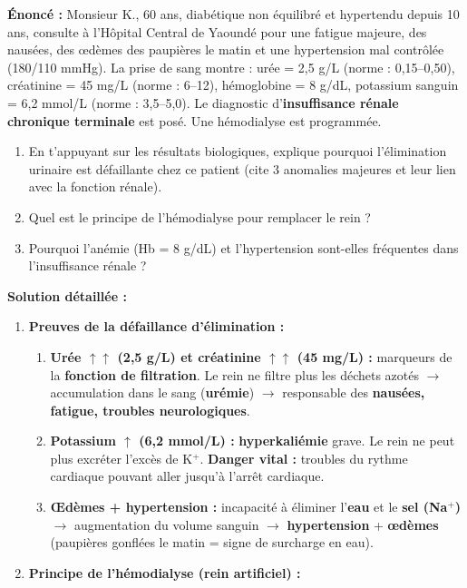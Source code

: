 \documentclass[11pt]{article}
\begin{document}
\begin{exoresolu}
    \textbf{Énoncé :} Monsieur K., 60 ans, diabétique non équilibré et hypertendu depuis 10 ans, consulte à l'Hôpital Central de Yaoundé pour une fatigue majeure, des nausées, des œdèmes des paupières le matin et une hypertension mal contrôlée (180/110 mmHg). La prise de sang montre : urée = 2,5 g/L (norme : 0,15--0,50), créatinine = 45 mg/L (norme : 6--12), hémoglobine = 8 g/dL, potassium sanguin = 6,2 mmol/L (norme : 3,5--5,0). Le diagnostic d'\textbf{insuffisance rénale chronique terminale} est posé. Une hémodialyse est programmée.
    \begin{enumerate}
        \item En t'appuyant sur les résultats biologiques, explique pourquoi l'élimination urinaire est défaillante chez ce patient (cite 3 anomalies majeures et leur lien avec la fonction rénale).
        \item Quel est le principe de l'hémodialyse pour remplacer le rein ?
        \item Pourquoi l'anémie (Hb = 8 g/dL) et l'hypertension sont-elles fréquentes dans l'insuffisance rénale ?
    \end{enumerate}
    \tcblower
    \textbf{Solution détaillée :}
    \begin{enumerate}
        \item \textbf{Preuves de la défaillance d'élimination :}
            \begin{enumerate}
                \item \textbf{Urée $\uparrow\uparrow$ (2,5 g/L) et créatinine $\uparrow\uparrow$ (45 mg/L) :} marqueurs de la \textbf{fonction de filtration}. Le rein ne filtre plus les déchets azotés $\rightarrow$ accumulation dans le sang (\textbf{urémie}) $\rightarrow$ responsable des \textbf{nausées, fatigue, troubles neurologiques}.
                \item \textbf{Potassium $\uparrow$ (6,2 mmol/L) :} \textbf{hyperkaliémie} grave. Le rein ne peut plus excréter l'excès de K$^+$. \textbf{Danger vital :} troubles du rythme cardiaque pouvant aller jusqu'à l'arrêt cardiaque.
                \item \textbf{Œdèmes + hypertension :} incapacité à éliminer l'\textbf{eau} et le \textbf{sel (Na$^+$)} $\rightarrow$ augmentation du volume sanguin $\rightarrow$ \textbf{hypertension} + \textbf{œdèmes} (paupières gonflées le matin = signe de surcharge en eau).
            \end{enumerate}
        \item \textbf{Principe de l'hémodialyse (rein artificiel) :}

\end{enumerate}
\end{exoresolu}
\end{document}
